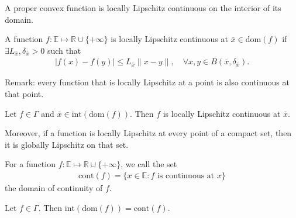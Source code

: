 \documentclass{tufte-handout}
\begin{document}
A proper convex function is locally Lipschitz continuous on the interior of its domain.
\begin{Definition}
    A function \( f:\mathbb{E}\mapsto \mathbb{R}\cup \{+\infty\} \) is locally Lipschitz continuous at \( \bar x \in \text{dom}(f) \) 
    if \(\exists L_{\bar x}, \delta_{\bar x} > 0\) such that 
    \begin{align}
    |f(x) - f(y)| \leq L_{\bar x} \|x-y\|, \quad \forall x, y \in B(\bar x, \delta_{\bar x}).
    \end{align}
\end{Definition}
Remark: every function that is locally Lipschitz at a point is also continuous at that point.


\begin{Theorem}
    Let \( f\in \Gamma \) and \( \bar x \in \text{int}(\text{dom}(f)) \). Then \( f \) is locally Lipschitz continuous at \( \bar x \).
\end{Theorem}

Moreover, if a function is locally Lipschitz at every point of a compact set, then it is globally Lipschitz on that set.

\begin{Definition}
    For a function \( f:\mathbb{E}\mapsto \mathbb{R}\cup \{+\infty\} \), we call the set
    \begin{align}
    \text{cont}(f) = \{ x \in \mathbb{E} : f \text{ is continuous at } x \}
    \end{align}
    the domain of continuity of \( f \).
\end{Definition}

\begin{Corollary}
    Let \( f\in \Gamma \). Then \( \text{int}(\text{dom}(f)) = \text{cont}(f) \).
\end{Corollary}
\end{document}
